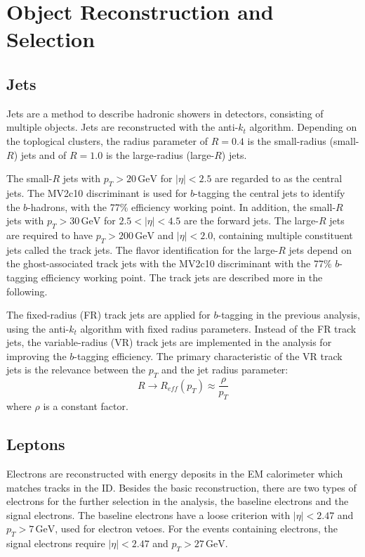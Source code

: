 \documentclass[class=NTHU_thesis, crop=false]{standalone}
\begin{document}
\section{Object Reconstruction and Selection}
\subsection{Jets}
Jets are a method to describe hadronic showers in detectors, consisting of multiple objects. Jets are reconstructed with the anti-$k_t$ algorithm. Depending on the toplogical clusters, the radius parameter of $R = 0.4$ is the small-radius (small-$R$) jets and of $R = 1.0$ is the large-radius (large-$R$) jets.

The small-$R$ jets with $p_T > 20\, \mathrm{GeV}$ for $\left|\eta\right| < 2.5$ are regarded to as the central jets. The MV2c10 discriminant is used for $b$-tagging the central jets to identify the $b$-hadrons, with the 77\% efficiency working point. In addition, the small-$R$ jets with $p_T > 30\, \mathrm{GeV}$ for $2.5 < \left|\eta\right| < 4.5$ are the forward jets. The large-$R$ jets are required to have $p_T > 200\, \mathrm{GeV}$ and $\left|\eta\right| < 2.0$, containing multiple constituent jets called the track jets. The flavor identification for the large-$R$ jets depend on the ghost-associated track jets with the MV2c10 discriminant with the 77\% $b$-tagging efficiency working point. The track jets are described more in the following.

The fixed-radius (FR) track jets are applied for $b$-tagging in the previous analysis, using the anti-$k_t$ algorithm with fixed radius parameters. Instead of the FR track jets, the variable-radius (VR) track jets are implemented in the analysis for improving the $b$-tagging efficiency. The primary characteristic of the VR track jets is the relevance between the $p_T$ and the jet radius parameter: 
\begin{equation}
R \to R_{eff}(p_T) \approx \frac{\rho}{p_T}
\end{equation}
where $\rho$ is a constant factor.

\subsection{Leptons}
Electrons are reconstructed with energy deposits in the EM calorimeter which matches tracks in the ID. Besides the basic reconstruction, there are two types of electrons for the further selection in the analysis, the baseline electrons and the signal electrons. The baseline electrons have a loose criterion with $\left|\eta\right| < 2.47$ and $p_T > 7\, \mathrm{GeV}$, used for electron vetoes. For the events containing electrons, the signal electrons require $\left|\eta\right| < 2.47$ and $p_T > 27\, \mathrm{GeV}$.
\end{document}
